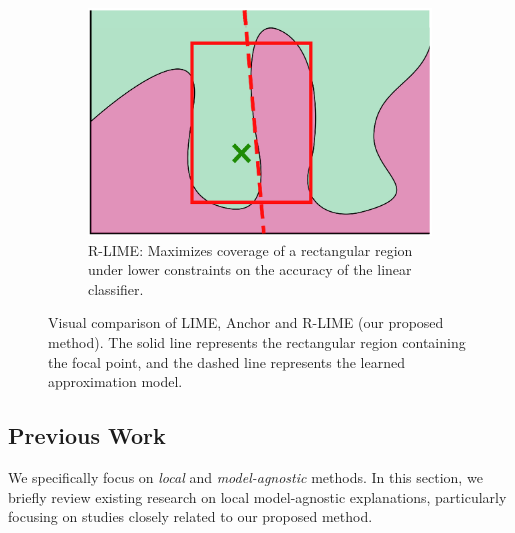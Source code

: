 \documentclass[11pt]{article}
\begin{document}
\begin{figure}[tbp]
\begin{subfigure}[t]{0.3\textwidth}
  \end{subfigure}
  \hspace{0.03\textwidth}
  \begin{subfigure}[t]{0.3\textwidth}
    \centering
    \includegraphics[width=\textwidth]{visual-rlime3}
    \caption{%
      R-LIME:
      Maximizes coverage of a rectangular region
      under lower constraints on the accuracy of the linear classifier.
    }\label{fig:rlime}
  \end{subfigure}
  \caption[Visual comparison of LIME, Anchor and R-LIME]{%
    Visual comparison of LIME, Anchor and R-LIME (our proposed method).
    The solid line represents the rectangular region containing the focal
    point, and the dashed line represents the learned approximation model.
  }
\end{figure}

\subsection{Previous Work}
We specifically focus on \emph{local} and \emph{model-agnostic} methods.
In this section,
we briefly review existing research on local model-agnostic explanations,
particularly focusing on studies closely related to our proposed method.
\end{document}
